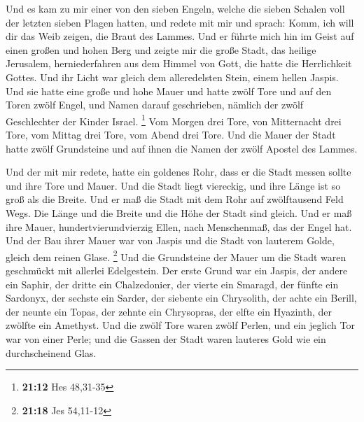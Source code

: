  Und es kam zu mir einer von den sieben Engeln, welche die
sieben Schalen voll der letzten sieben Plagen hatten, und redete mit mir
und sprach: Komm, ich will dir das Weib zeigen, die Braut des Lammes.
 Und er führte mich hin im Geist auf einen großen und hohen
Berg und zeigte mir die große Stadt, das heilige Jerusalem,
herniederfahren aus dem Himmel von Gott,  die hatte die
Herrlichkeit Gottes. Und ihr Licht war gleich dem alleredelsten Stein,
einem hellen Jaspis.  Und sie hatte eine große und hohe
Mauer und hatte zwölf Tore und auf den Toren zwölf Engel, und Namen
darauf geschrieben, nämlich der zwölf Geschlechter der Kinder Israel.
\footnote{\textbf{21:12} Hes 48,31-35}  Vom Morgen drei
Tore, von Mitternacht drei Tore, vom Mittag drei Tore, vom Abend drei
Tore.  Und die Mauer der Stadt hatte zwölf Grundsteine und
auf ihnen die Namen der zwölf Apostel des Lammes.

 Und der mit mir redete, hatte ein goldenes Rohr, dass er
die Stadt messen sollte und ihre Tore und Mauer.  Und die
Stadt liegt viereckig, und ihre Länge ist so groß als die Breite. Und er
maß die Stadt mit dem Rohr auf zwölftausend Feld Wegs. Die Länge und die
Breite und die Höhe der Stadt sind gleich.  Und er maß ihre
Mauer, hundertvierundvierzig Ellen, nach Menschenmaß, das der Engel hat.
 Und der Bau ihrer Mauer war von Jaspis und die Stadt von
lauterem Golde, gleich dem reinen Glase. \footnote{\textbf{21:18} Jes
  54,11-12}  Und die Grundsteine der Mauer um die Stadt
waren geschmückt mit allerlei Edelgestein. Der erste Grund war ein
Jaspis, der andere ein Saphir, der dritte ein Chalzedonier, der vierte
ein Smaragd,  der fünfte ein Sardonyx, der sechste ein
Sarder, der siebente ein Chrysolith, der achte ein Berill, der neunte
ein Topas, der zehnte ein Chrysopras, der elfte ein Hyazinth, der
zwölfte ein Amethyst.  Und die zwölf Tore waren zwölf
Perlen, und ein jeglich Tor war von einer Perle; und die Gassen der
Stadt waren lauteres Gold wie ein durchscheinend Glas.

